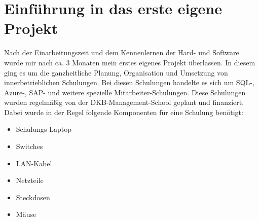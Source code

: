 \section{Einführung in das erste eigene Projekt}
\label{sec:Einführung in das erste eigene Projekt}

Nach der Einarbeitungszeit und dem Kennenlernen der Hard- und Software wurde mir nach ca. 3 Monaten mein erstes eigenes Projekt überlassen. In diesem ging es um die ganzheitliche Planung, Organisation und Umsetzung von innerbetrieblichen Schulungen. Bei diesen Schulungen handelte es sich um SQL-, Azure-, SAP- und weitere spezielle Mitarbeiter-Schulungen. Diese Schulungen wurden regelmäßig von der DKB-Management-School geplant und finanziert. Dabei wurde in der Regel folgende Komponenten für eine Schulung benötigt:
\begin{itemize}
	\item Schulungs-Laptop
	\item Switches
	\item LAN-Kabel
	\item Netzteile
	\item Steckdosen
	\item Mäuse
\end{itemize}
\noindent

